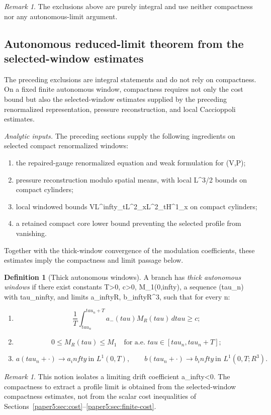 \documentclass[11pt]{amsart}
\def\({}%
\def\){}%
\def\mathbb#1{#1}%
\def\tau{tau}%
\def\infty{infty}%
\theoremstyle{plain}
\theoremstyle{definition}
\newtheorem{definition}[theorem]{Definition}
\theoremstyle{remark}
\newtheorem{remark}[theorem]{Remark}
\begin{document}
\begin{remark}
The exclusions above are purely integral and use neither compactness nor any
autonomous-limit argument.
\end{remark}

\subsection{Autonomous reduced-limit theorem from the selected-window estimates}
\label{paper5:sec:autonomous}

The preceding exclusions are integral statements and do not rely on compactness.  On a fixed finite autonomous window, compactness requires not only the cost bound but also the selected-window estimates supplied by the preceding renormalized representation, pressure reconstruction, and local Caccioppoli estimates.

\medskip
\noindent\textit{Analytic inputs.}
The preceding sections supply the following ingredients on selected compact
renormalized windows:
\begin{enumerate}[label=(\arabic*)]
  \item the repaired-gauge renormalized equation and weak formulation for \((V,P)\);
  \item pressure reconstruction modulo spatial means, with local \(L^{3/2}\) bounds on compact
    cylinders;
  \item local windowed bounds
  \(V\in L^\infty_tL^2_x\cap L^2_tH^1_x\) on compact cylinders;
  \item a retained compact core lower bound preventing the selected profile from vanishing.
\end{enumerate}
Together with the thick-window convergence of the modulation coefficients, these estimates imply
the compactness and limit passage below.

\begin{definition}[Thick autonomous windows]\label{paper5:def:thick-autonomous-windows}
A branch has \emph{thick autonomous windows} if there exist constants
\(T>0\), \(c>0\), \(M_1\in(0,\infty)\), a sequence \((\tau_n)\) with
\(\tau_n\to\infty\), and limits \(a_\infty\in\mathbb R\),
\(b_\infty\in\mathbb R^3\), such that for every \(n\):
\begin{enumerate}[label=(\roman*)]
  \item
  \[
    \frac1T\int_{\tau_n}^{\tau_n+T}a_-(\tau)M_R(\tau)
    \,d\tau\ge c;
  \]
  \item
  \[
    0\le M_R(\tau)\le M_1\quad\text{for a.e. }\tau\in[\tau_n,\tau_n+T];
  \]
  \item
  \[
    a(\tau_n+\cdot)\to a_\infty\ \text{in }L^1(0,T),
    \qquad
    b(\tau_n+\cdot)\to b_\infty\ \text{in }L^1(0,T;\mathbb R^3).
  \]
\end{enumerate}
\end{definition}
\begin{remark}
This notion isolates a limiting drift coefficient \(a_\infty<0\).  The
compactness to extract a profile limit is obtained from the selected-window compactness estimates,
not from the scalar cost inequalities of Sections~\ref{paper5:sec:cost}--\ref{paper5:sec:finite-cost}.
\end{remark}
\end{document}
